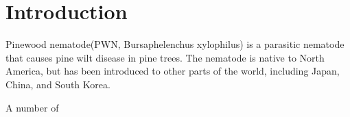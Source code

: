 \section{Introduction}

Pinewood nematode(PWN, Bursaphelenchus xylophilus) is a parasitic nematode that causes pine wilt disease in pine trees. The nematode is native to North America, but has been introduced to other parts of the world, including Japan, China, and South Korea\cite{kimShortReviewPinewood2020}.



A number of     